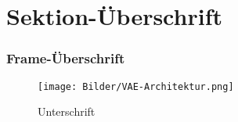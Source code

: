

\author[Jannis Klingler]{Nix}


\beamertemplatenavigationsymbolsempty{}




\section{Sektion-Überschrift}

\begin{frame}
	\frametitle{Frame-Überschrift}
	\begin{figure}[htbp!]
		\texttt{[image: Bilder/VAE-Architektur.png]}
		\caption{Unterschrift}
	\end{figure}
\end{frame}
